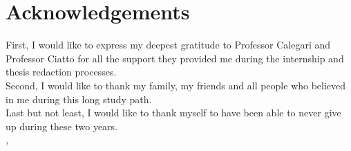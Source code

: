
\cleardoublepage
{}
{}



\begingroup
\let\clearpage\relax
\let\cleardoublepage\relax
\let\cleardoublepage\relax

\chapter*{Acknowledgements}

\noindent First, I would like to express my deepest gratitude to Professor Calegari and Professor Ciatto for all the support they provided me during the internship and thesis redaction processes.\\

\noindent Second, I would like to thank my family, my friends and all people who believed in me during this long study path.\\


\noindent Last but not least, I would like to thank myself to have been able to never give up during these two years. \\

\noindent\textit{\myLocation, \myTime}
\hfill \myName

\endgroup

